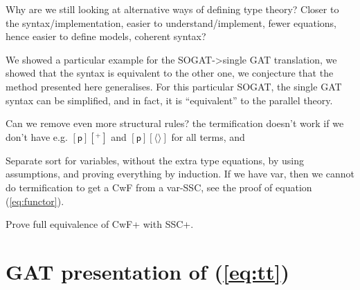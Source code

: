 \documentclass[sigplan,10pt,anonymous,review]{acmart}\settopmatter{printfolios=true,printccs=false,printacmref=false}
\newcommand{\p}{\mathsf{p}}
\begin{document}
Why are we still looking at alternative ways of defining type theory?
Closer to the syntax/implementation, easier to understand/implement,
fewer equations, hence easier to define models, coherent syntax?

We showed a particular example for the SOGAT->single GAT translation,
we showed that the syntax is equivalent to the other one, we
conjecture that the method presented here generalises. For this
particular SOGAT, the single GAT syntax can be simplified, and in
fact, it is ``equivalent'' to the parallel theory.

Can we remove even more structural rules? the termification doesn't
work if we don't have e.g. $[\p][^+]$ and $[\p][\langle\rangle]$ for all terms, and 

Separate sort for variables, without the extra type equations, by
using assumptions, and proving everything by induction. If we have
var, then we cannot do termification to get a CwF from a var-SSC, see
the proof of equation (\ref{eq:functor}).

Prove full equivalence of CwF+ with SSC+.

{}


\pagebreak

\phantom{A}

\pagebreak

\appendix

\section{GAT presentation of (\ref{eq:tt})}
\label{app:tt}
\end{document}
